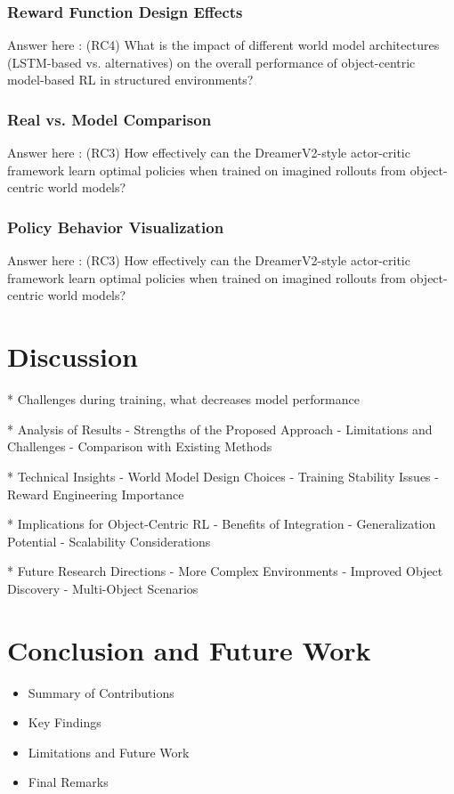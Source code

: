 \documentclass[
	english,
	ruledheaders=section,
	class=report,
	thesis={type=master},
	accentcolor=9c,
	custommargins=true,
	marginpar=false,
	parskip=half-,
	fontsize=11pt,
]{tudapub}
\begin{document}
\subsection{Reward Function Design Effects}
\label{subsec:reward_effects}
Answer here : (RC4) What is the impact of different world model architectures (LSTM-based vs. alternatives) on the overall performance of object-centric model-based RL in structured environments?


\subsection{Real vs. Model Comparison}
\label{subsec:real_vs_model}
Answer here : (RC3) How effectively can the DreamerV2-style actor-critic framework learn optimal policies when trained on imagined rollouts from object-centric world models?


\subsection{Policy Behavior Visualization}
\label{subsec:policy_visualization}
Answer here : (RC3) How effectively can the DreamerV2-style actor-critic framework learn optimal policies when trained on imagined rollouts from object-centric world models?

\chapter{Discussion}
\label{chap:discussion}
* Challenges during training, what decreases model performance

* Analysis of Results
	- Strengths of the Proposed Approach
	- Limitations and Challenges
	- Comparison with Existing Methods

* Technical Insights
	- World Model Design Choices
	- Training Stability Issues
	- Reward Engineering Importance

* Implications for Object-Centric RL
	- Benefits of Integration
	- Generalization Potential
	- Scalability Considerations

* Future Research Directions
	- More Complex Environments
	- Improved Object Discovery
	- Multi-Object Scenarios

\chapter{Conclusion and Future Work}
\label{chap:conclusion}

\begin{itemize}
	\item Summary of Contributions
	\item Key Findings
	\item Limitations and Future Work
	\item Final Remarks
\end{itemize}
\end{document}
